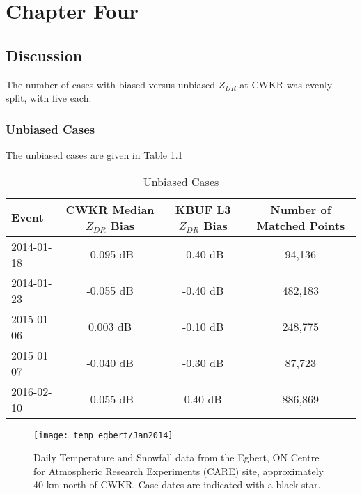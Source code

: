\chapter{Chapter Four}
\section{Discussion}
The number of cases with biased versus unbiased $Z_{DR}$ at CWKR was evenly split, with five each.
\subsection{Unbiased Cases}
The unbiased cases are given in Table \ref{unbiasedcases}
\begin{table}[h]
    \caption{Unbiased Cases}\label{unbiasedcases}
    \begin{center}
    \begin{tabular}{|l|c|c|c|}
    \hline
     Event & CWKR Median $Z_{DR}$ Bias & KBUF L3 $Z_{DR}$ Bias & Number of Matched Points\\
    \hline\hline
    2014-01-18 & -0.095 dB & -0.40 dB & 94,136 \\
    \hline
    2014-01-23 & -0.055 dB & -0.40 dB & 482,183 \\
    \hline
    2015-01-06 &  0.003 dB & -0.10 dB & 248,775 \\
    \hline
    2015-01-07 & -0.040 dB & -0.30 dB & 87,723 \\ 
    \hline
    2016-02-10 & -0.055 dB & 0.40 dB & 886,869 \\ 
    \hline
    \end{tabular}
    \end{center}
\end{table}
\begin{figure}[H]
\texttt{[image: temp\_egbert/Jan2014]}
\caption{Daily Temperature and Snowfall data from the Egbert, ON Centre for Atmospheric Research Experiments (CARE) site, approximately 40 km north of CWKR. Case dates are indicated with a black star.} 
\label{fig:grid_ref_20140118}
\end{figure}
